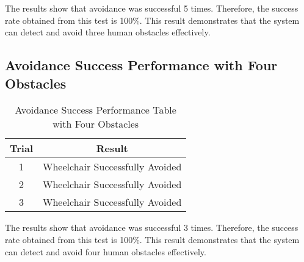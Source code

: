 The results show that avoidance was successful 5 times. Therefore, the success rate obtained from this test is 100\%. This result demonstrates that the system can detect and avoid three human obstacles effectively.

\subsection{Avoidance Success Performance with Four Obstacles}
\begin{table}[H]
    \centering
    \caption{Avoidance Success Performance Table with Four Obstacles}
    \label{tb:mantapkali3}
    \begin{tabular}{|c|c|}
    \hline
    Trial & Result                                                  \\ \hline
    1         & \cellcolor[HTML]{9AFF99}Wheelchair Successfully Avoided \\ \hline
    2         & \cellcolor[HTML]{9AFF99}Wheelchair Successfully Avoided \\ \hline
    3         & \cellcolor[HTML]{9AFF99}Wheelchair Successfully Avoided \\ \hline
    \end{tabular}
    \end{table}

The results show that avoidance was successful 3 times. Therefore, the success rate obtained from this test is 100\%. This result demonstrates that the system can detect and avoid four human obstacles effectively.
